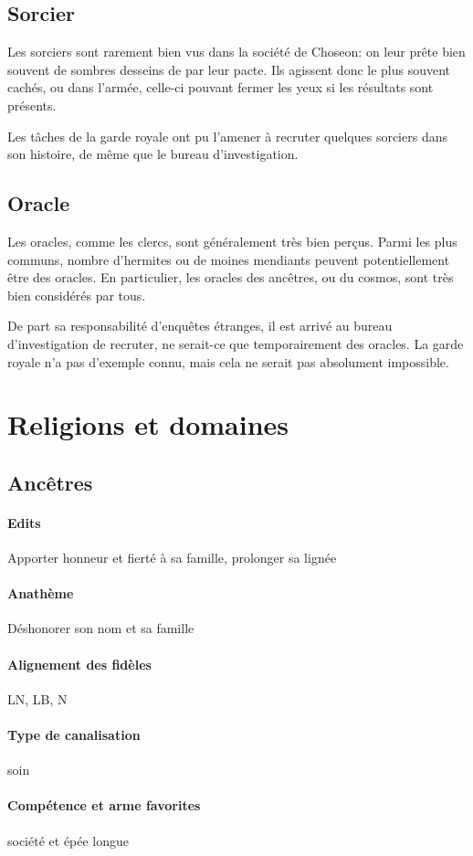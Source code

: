 \documentclass[10pt,a4paper]{book}
\newcommand{\nomroyaume}{Choseon}
\begin{document}
\subsection{Sorcier}
Les sorciers sont rarement bien vus dans la société de \nomroyaume : on leur prête bien souvent de sombres desseins de par leur pacte. Ils agissent donc le plus souvent cachés, ou dans l'armée, celle-ci pouvant fermer les yeux si les résultats sont présents.

Les tâches de la garde royale ont pu l'amener à recruter quelques sorciers dans son histoire, de même que le bureau d'investigation.
\subsection{Oracle}
Les oracles, comme les clercs, sont généralement très bien perçus. Parmi les plus communs, nombre d'hermites ou de moines mendiants peuvent potentiellement être des oracles. En particulier, les oracles des ancêtres, ou du cosmos, sont très bien considérés par tous.

De part sa responsabilité d'enquêtes étranges, il est arrivé au bureau d'investigation de recruter, ne serait-ce que temporairement des oracles. La garde royale n'a pas d'exemple connu, mais cela ne serait pas absolument impossible.
\section{Religions et domaines}
\subsection{Ancêtres}
\paragraph{Edits}Apporter honneur et fierté à sa famille, prolonger sa lignée
\paragraph{Anathème}Déshonorer son nom et sa famille
\paragraph{Alignement des fidèles} LN, LB, N
\paragraph{Type de canalisation}soin
\paragraph{Compétence et arme favorites} société et épée longue
\end{document}
